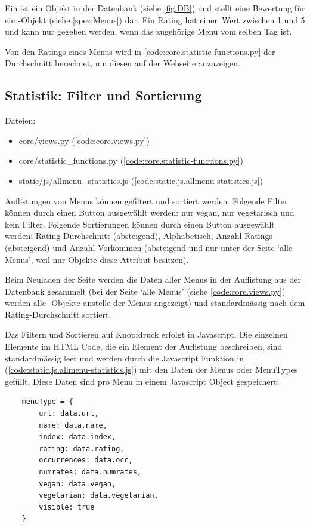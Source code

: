 Ein  ist ein Objekt in der Datenbank (siehe \ref{fig:DB}) und stellt
eine Bewertung für ein -Objekt (siehe \ref{spez:Menus}) dar. Ein
Rating hat einen Wert zwischen 1 und 5 und kann nur gegeben werden, wenn das
zugehörige Menu vom selben Tag ist.

Von den Ratings eines Menus wird in 
\ref{code:core.statistic-functions.py} der Durchschnitt berechnet, um diesen auf
der Webseite anzuzeigen.


\subsection{Statistik: Filter und Sortierung} \label{spez:Statistik}

Dateien:
\begin{itemize}
    \item core/views.py (\ref{code:core.views.py})
    \item core/statistic\_functions.py (\ref{code:core.statistic-functions.py})
    \item static/js/allmenu\_statistics.js (\ref{code:static.js.allmenu-statistics.js})
\end{itemize}

Auflistungen von Menus können gefiltert und sortiert werden. Folgende Filter
können durch einen Button ausgewählt werden: nur vegan, nur vegetarisch und kein
Filter. Folgende Sortierungen können durch einen Button ausgewählt werden:
Rating-Durchschnitt (absteigend), Alphabetisch, Anzahl Ratings (absteigend) und Anzahl
Vorkommen (absteigend und nur unter der Seite `alle Menus', weil nur 
Objekte diese Attribut besitzen).

Beim Neuladen der Seite werden die Daten aller Menus in der Auflistung aus der
Datenbank gesammelt (bei der Seite `alle Menus' (siehe \ref{code:core.views.py})
werden alle -Objekte anstelle der Menus angezeigt) und
standardmässig nach dem Rating-Durchschnitt sortiert. 

Das Filtern und Sortieren auf Knopfdruck erfolgt in Javascript. Die einzelnen
 Elemente im HTML Code, die ein Element der Auflistung beschreiben,
sind standardmässig leer und werden durch die Javascript Funktion
 in 
(\ref{code:static.js.allmenu-statistics.js}) mit den Daten der Menus oder
MenuTypes gefüllt. Diese Daten sind pro Menu in einem Javascript Object
gespeichert:

\begin{lstlisting}
    menuType = {
        url: data.url,
        name: data.name,
        index: data.index,
        rating: data.rating,
        occurrences: data.occ,
        numrates: data.numrates,
        vegan: data.vegan,
        vegetarian: data.vegetarian,
        visible: true
    }
\end{lstlisting}

